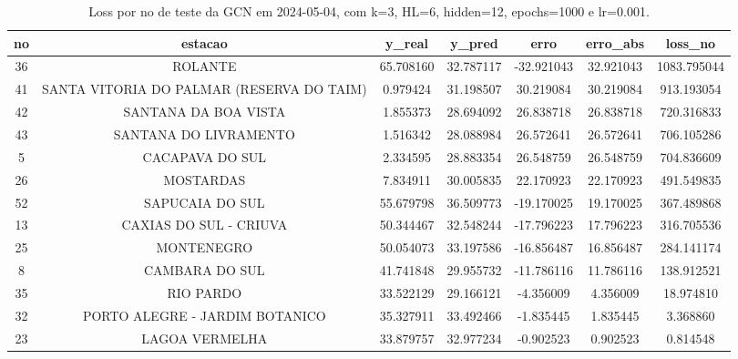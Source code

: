 \begin{table}[h]
\centering
\caption{Loss por no de teste da GCN em 2024-05-04, com k=3, HL=6, hidden=12, epochs=1000 e lr=0.001.}
\label{tab:gcn_loss_k3_hl6_h12_e1000_d20240504}
\begin{tabular}{ccccccc}
\toprule
no & estacao & y\_real & y\_pred & erro & erro\_abs & loss\_no \\
\midrule
36 & ROLANTE & 65.708160 & 32.787117 & -32.921043 & 32.921043 & 1083.795044 \\
41 & SANTA VITORIA DO PALMAR (RESERVA DO TAIM) & 0.979424 & 31.198507 & 30.219084 & 30.219084 & 913.193054 \\
42 & SANTANA DA BOA VISTA & 1.855373 & 28.694092 & 26.838718 & 26.838718 & 720.316833 \\
43 & SANTANA DO LIVRAMENTO & 1.516342 & 28.088984 & 26.572641 & 26.572641 & 706.105286 \\
5 & CACAPAVA DO SUL & 2.334595 & 28.883354 & 26.548759 & 26.548759 & 704.836609 \\
26 & MOSTARDAS & 7.834911 & 30.005835 & 22.170923 & 22.170923 & 491.549835 \\
52 & SAPUCAIA DO SUL & 55.679798 & 36.509773 & -19.170025 & 19.170025 & 367.489868 \\
13 & CAXIAS DO SUL - CRIUVA & 50.344467 & 32.548244 & -17.796223 & 17.796223 & 316.705536 \\
25 & MONTENEGRO & 50.054073 & 33.197586 & -16.856487 & 16.856487 & 284.141174 \\
8 & CAMBARA DO SUL & 41.741848 & 29.955732 & -11.786116 & 11.786116 & 138.912521 \\
35 & RIO PARDO & 33.522129 & 29.166121 & -4.356009 & 4.356009 & 18.974810 \\
32 & PORTO ALEGRE - JARDIM BOTANICO & 35.327911 & 33.492466 & -1.835445 & 1.835445 & 3.368860 \\
23 & LAGOA VERMELHA & 33.879757 & 32.977234 & -0.902523 & 0.902523 & 0.814548 \\
\bottomrule
\end{tabular}
\end{table}
